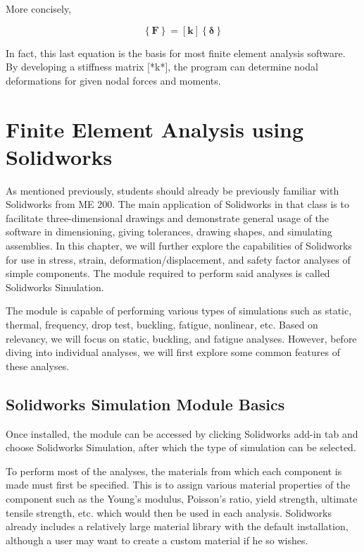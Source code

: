 \documentclass[a4paper,openany,12pt]{book}
\begin{document}
{{More concisely,

$$\left\{ \mathbf{F} \right\} = \left[ \mathbf{k} \right]\left\{ \bm\delta \right\}$$

In fact, this last equation is the basis for most finite element
analysis software. By developing a stiffness matrix [*k*], the program
can determine nodal deformations for given nodal forces and moments.

\section{Finite Element Analysis using Solidworks}
\label{sec:orgbbc5637}
As mentioned previously, students should already be previously familiar
with Solidworks from ME 200. The main application of Solidworks in that
class is to facilitate three-dimensional drawings and demonstrate
general usage of the software in dimensioning, giving tolerances,
drawing shapes, and simulating assemblies. In this chapter, we will
further explore the capabilities of Solidworks for use in stress,
strain, deformation/displacement, and safety factor analyses of simple
components. The module required to perform said analyses is called
Solidworks Simulation.

The module is capable of performing various types of simulations such as
static, thermal, frequency, drop test, buckling, fatigue, nonlinear,
etc. Based on relevancy, we will focus on static, buckling, and fatigue
analyses. However, before diving into individual analyses, we will first
explore some common features of these analyses.

\subsection{Solidworks Simulation Module Basics}
\label{sec:org6fee3ea}
Once installed, the module can be accessed by clicking Solidworks add-in
tab and choose Solidworks Simulation, after which the type of simulation
can be selected.

To perform most of the analyses, the materials from which each component
is made must first be specified. This is to assign various material
properties of the component such as the Young's modulus, Poisson's
ratio, yield strength, ultimate tensile strength, etc. which would then
be used in each analysis. Solidworks already includes a relatively large
material library with the default installation, although a user may want
to create a custom material if he so wishes.

}}
\end{document}
